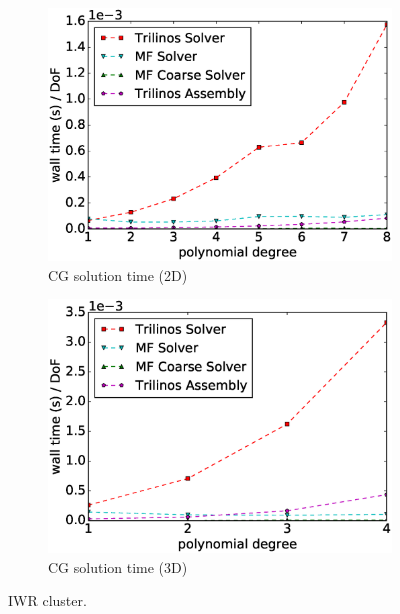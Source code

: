 \documentclass[times,doublespace]{nmeauth}
\begin{document}
\begin{figure}[!ht]
\begin{subfigure}[b]{0.49\textwidth}
    \includegraphics[width=\textwidth]{IWR_solver2d.eps}
    \caption{CG solution time (2D)}
    \label{fig:benchmark_miehe_IWR_sol2}
  \end{subfigure}
  \begin{subfigure}[b]{0.49\textwidth}
    \centering
    \includegraphics[width=\textwidth]{IWR_solver3d.eps}
    \caption{CG solution time (3D)}
    \label{fig:benchmark_miehe_IWR_sol3}
  \end{subfigure}
  \caption{IWR cluster.}%
  \label{fig:benchmark_miehe_IWR_cg}
\end{figure}
\end{document}
